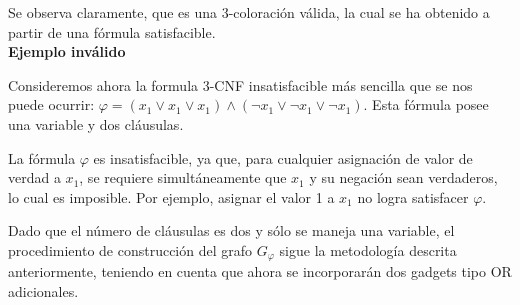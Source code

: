 \documentclass[a4paper,12pt]{article}
\begin{document}
\begin{itemize}
\begin{center}
\end{center}
Se observa claramente, que es una 3-coloración válida, la cual se ha obtenido a partir de una fórmula satisfacible.\\

\textbf{Ejemplo inválido}

Consideremos ahora la formula 3-CNF insatisfacible más sencilla que se nos puede ocurrir: $\varphi = (x_1 \lor x_1 \lor x_1) \land (\lnot x_1 \lor \lnot x_1 \lor \lnot x_1)$. Esta fórmula posee una variable y dos cláusulas.

La fórmula $\varphi$ es insatisfacible, ya que, para cualquier asignación de valor de verdad a $x_1$, se requiere simultáneamente que $x_1$ y su negación sean verdaderos, lo cual es imposible. Por ejemplo, asignar el valor 1 a $x_1$ no logra satisfacer $\varphi$.

Dado que el número de cláusulas es dos y sólo se maneja una variable, el procedimiento de construcción del grafo $G_\varphi$ sigue la metodología descrita anteriormente, teniendo en cuenta que ahora se incorporarán dos gadgets tipo OR adicionales.



\end{itemize}
\end{document}
